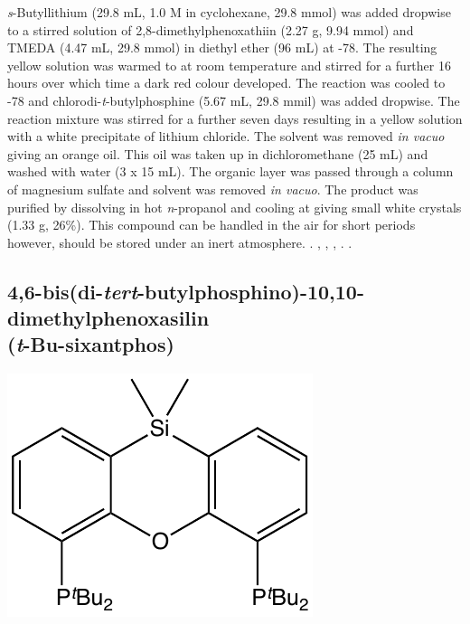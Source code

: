 \noindent{}\emph{s}-Butyllithium (29.8 mL, 1.0 M in cyclohexane, 29.8 mmol) was added dropwise to a stirred solution of 2,8-dimethylphenoxathiin (2.27 g, 9.94 mmol) and TMEDA (4.47 mL, 29.8 mmol) in diethyl ether (96 mL) at -78\degC{}.  The resulting yellow solution was warmed to at room temperature and stirred for a further 16 hours over which time a dark red colour developed.  The reaction was cooled to -78\degC{} and chlorodi-\emph{t}-butylphosphine (5.67 mL, 29.8 mmil) was added dropwise.  The reaction mixture was stirred for a further seven days resulting in a yellow solution with a white precipitate of lithium chloride.  The solvent was removed \emph{in vacuo} giving an orange oil.  This oil was taken up in dichloromethane (25 mL) and washed with water (3 x 15 mL).  The organic layer was passed through a column of magnesium sulfate and solvent was removed \emph{in vacuo}.  The product was purified by dissolving in hot \emph{n}-propanol and cooling at  giving small white crystals (1.33 g, 26\%).  This compound can be handled in the air for short periods however, should be stored under an inert atmosphere.
.
,
,
,
.
.

\subsection*{4,6-bis(di-\emph{tert}-butylphosphino)-10,10-dimethylphenoxasilin \\(\emph{t}-Bu-sixantphos)}

\begin{structure}[h]
\begin{center}
\includegraphics[scale=0.7]{../Structures/SiP(tBu)2_ligand.pdf}
\end{center}
\end{structure}

